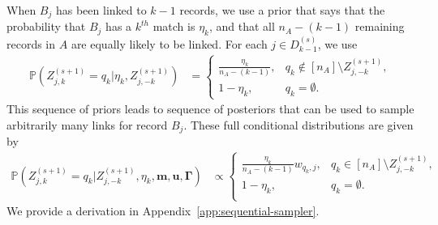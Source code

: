 \documentclass[12pt,letterpaper]{article}
\newcommand{\1}[1]{\mathbb{I}\!\left[#1\right]} %
\begin{document}
When $B_j$ has been linked to $k-1$ records, we use a prior that says that the probability that $B_j$ has a $k^{th}$ match is $\eta_k$, and that all $n_A - (k - 1)$ remaining records in $A$ are equally likely to be linked.  For each $j \in D_{k-1}^{(s)}$, we use
\begin{align} \label{eqn:sequential_prior}
	\mathbb{P}(Z_{j, k}^{(s+1)} = q_k|\eta_k, Z_{j, -k}^{(s+1)}) &= \begin{cases}
		\frac{\eta_k}{n_A - (k - 1)}, &  q_k \notin [n_A] \setminus Z_{j, -k}^{(s+1)}, \\
		1 - \eta_k, & q_k = \emptyset.
	\end{cases}
\end{align}
This sequence of priors leads to sequence of posteriors that can be used to sample arbitrarily many links for record $B_j$. These full conditional distributions are given by 
\begin{align} \label{eqn:sequential_posterior}
	\mathbb{P}(Z_{j, k}^{(s+1)} = q_k|Z_{j, -k}^{(s+1)}, \eta_k, \bm{m}, \bm{u}, \bm{\Gamma}) &\propto \begin{cases}
		\frac{\eta_k}{n_A - (k - 1)} w_{q_k, j}, & q_k \in [n_A] \setminus Z_{j, -k}^{(s+1)}, \\
		1 - \eta_k, & q_k= \emptyset. \\
	\end{cases}
\end{align}
We provide a derivation in Appendix~\ref{app:sequential-sampler}.
\end{document}
